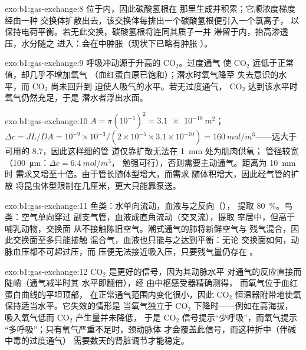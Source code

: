 \begin{solution}{exo:b1:gas-exchange:8}
位于内，因此碳酸氢根在
那里生成并积累；它顺浓度梯度经由一种
交换体扩散出去，该交换体每排出一个碳酸氢根便引入一个氯离子，
以保持电荷平衡。若无此交换，碳酸氢根将连同其质子一并
滞留于内，抬高渗透压，水分随之
进入：会在中肿胀（现状下已略有肿胀
）。
\end{solution}

\begin{solution}{exo:b1:gas-exchange:9}
呼吸冲动源于升高的 $\mathrm{CO_2}$。过度通气
使 $\mathrm{CO_2}$ 远低于正常值，却几乎不增加氧气
（血红蛋白原已饱和）；潜水时氧气降至
失去意识的水平，而 $\mathrm{CO_2}$ 尚未回升到
迫使人吸气的水平。若无过度通气，
$\mathrm{CO_2}$ 达到该水平时氧气仍然充足，于是
潜水者浮出水面。
\end{solution}

\begin{solution}{exo:b1:gas-exchange:10}
$A = \pi(10^{-5})^2 = \qty{3.1e-10}{m^2}$；$\Delta c = JL/DA =
10^{-9}\times 10^{-3}/(2\times 10^{-5}\times 3.1\times 10^{-10}) =
\qty{160}{mol/m^3}$——远大于可用的 \qty{8.7}{}，因此这样细的管
道仅靠扩散无法在 \qty{1}{mm} 处为肌肉供氧；
管径较宽（\qty{100}{\micro m}：$\Delta c = \qty{6.4}{mol/m^3}$，
勉强可行），否则需要主动通气。距离为 \qty{10}{mm} 时
需求又增至十倍。由于管长随体型增大，而需求
随体积增大，因此经气管的扩散
将昆虫体型限制在几厘米，更大只能靠泵送。
\end{solution}

\begin{solution}{exo:b1:gas-exchange:11}
鱼类：水单向流动，血液与之反向（），
提取 \qty{80}{\%}。鸟类：空气单向穿过
副支气管，血液成直角流动（交叉流），提取
率居中，但高于哺乳动物，交换面
从不接触陈旧空气。潮式通气的肺将新鲜空气与
残气混合，因此交换面至多只能接触
混合气，血液也只能与之达到平衡：无论
交换面如何，动脉血压都不可超过压，而
压便无法接近吸入压，只要残气量仍存在
。
\end{solution}

\begin{solution}{exo:b1:gas-exchange:12}
$\mathrm{CO_2}$ 是更好的信号，因为其动脉水平
对通气的反应直接而陡峭（通气减半时其
水平即翻倍），经  由中枢感受器精确测得，
而氧气位于血红蛋白曲线的平坦顶部，
在正常通气范围内变化很小，因此
$\mathrm{CO_2}$ 恒温器附带地使氧保持适当水平。它失效的情形是
当氧气独立于 $\mathrm{CO_2}$ 下降时——例如在高海拔，
吸入氧气低而 $\mathrm{CO_2}$ 产生量并未降低，
于是 $\mathrm{CO_2}$ 信号提示“少呼吸”，而氧气提示
“多呼吸”；只有氧气严重不足时，颈动脉体
才会覆盖此信号，而这种折中（伴碱中毒的过度通气）
需要数天的肾脏调节才能稳定。
\end{solution}

